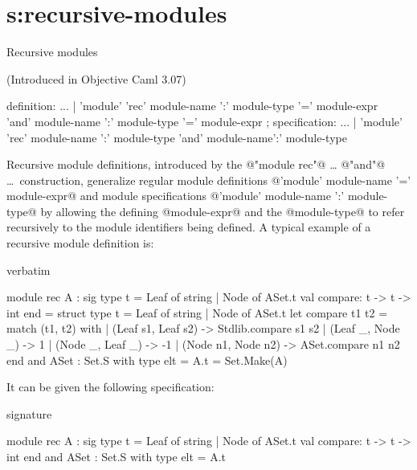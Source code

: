 \section{s:recursive-modules}{Recursive modules}

(Introduced in Objective Caml 3.07)


\begin{syntax}
definition:
        ...
      | 'module' 'rec' module-name ':' module-type '=' module-expr \\
        { 'and' module-name ':' module-type '=' module-expr }
;
specification:
        ...
      | 'module' 'rec' module-name ':' module-type
                 { 'and' module-name':' module-type }
\end{syntax}

Recursive module definitions, introduced by the @"module rec"@ \ldots
@"and"@ \ldots\ construction, generalize regular module definitions
@'module' module-name '=' module-expr@ and module specifications
@'module' module-name ':' module-type@ by allowing the defining
@module-expr@ and the @module-type@ to refer recursively to the module
identifiers being defined.  A typical example of a recursive module
definition is:
\begin{camlexample}{verbatim}
\begin{caml}
\begin{camlinput}
module rec A : sig
  type t = Leaf of string | Node of ASet.t
  val compare: t -> t -> int
end = struct
  type t = Leaf of string | Node of ASet.t
  let compare t1 t2 =
    match (t1, t2) with
    | (Leaf s1, Leaf s2) -> Stdlib.compare s1 s2
    | (Leaf _, Node _) -> 1
    | (Node _, Leaf _) -> -1
    | (Node n1, Node n2) -> ASet.compare n1 n2
end
and ASet
  : Set.S with type elt = A.t
  = Set.Make(A)
\end{camlinput}
\end{caml}
\end{camlexample}
It can be given the following specification:
\begin{camlexample}{signature}
\begin{caml}
\begin{camlinput}
module rec A : sig
  type t = Leaf of string | Node of ASet.t
  val compare: t -> t -> int
end
and ASet : Set.S with type elt = A.t
\end{camlinput}
\end{caml}
\end{camlexample}

